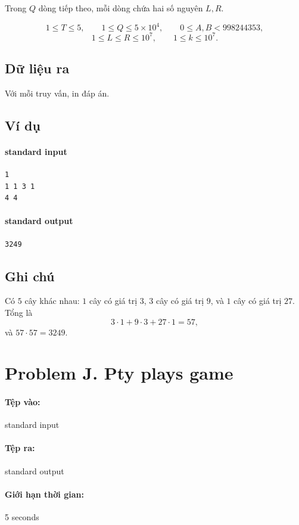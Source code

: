 \documentclass[11pt]{article}
\begin{document}
Trong \(Q\) dòng tiếp theo, mỗi dòng chứa hai số nguyên \(L,R\).

\[
  1\le T\le 5,\qquad
  1\le Q\le 5\times 10^4,\qquad
  0\le A,B<998244353,
\]
\[
  1\le L\le R\le 10^7,\qquad
  1\le k\le 10^7.
\]

\subsection*{Dữ liệu ra}

Với mỗi truy vấn, in đáp án.

\subsection*{Ví dụ}

\paragraph{standard input}
\begin{verbatim}
1
1 1 3 1
4 4
\end{verbatim}

\paragraph{standard output}
\begin{verbatim}
3249
\end{verbatim}

\subsection*{Ghi chú}

Có \(5\) cây khác nhau: \(1\) cây có giá trị \(3\), \(3\) cây có giá trị
\(9\), và \(1\) cây có giá trị \(27\). Tổng là
\[
  3\cdot 1+9\cdot 3+27\cdot 1=57,
\]
và \(57\cdot 57=3249\).

\section{Problem J. Pty plays game}

\paragraph{Tệp vào:} standard input
\paragraph{Tệp ra:} standard output
\paragraph{Giới hạn thời gian:} 5 seconds
\end{document}

